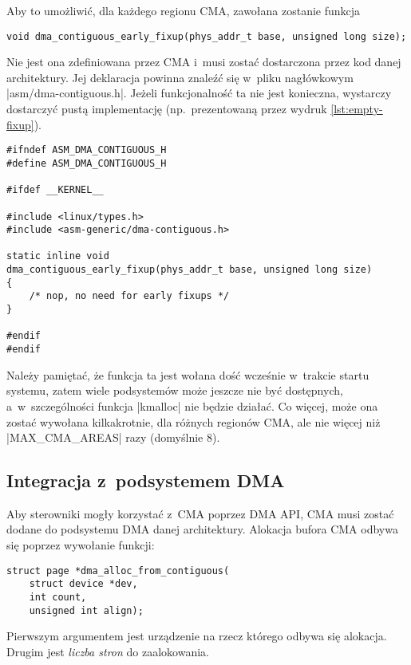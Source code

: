 Aby to umożliwić, dla każdego regionu CMA, zawołana zostanie funkcja

\begin{lstlisting}
void dma_contiguous_early_fixup(phys_addr_t base, unsigned long size);
\end{lstlisting}

Nie jest ona zdefiniowana przez CMA i~musi zostać dostarczona przez
kod danej architektury.  Jej deklaracja powinna znaleźć się w~pliku
nagłówkowym \code|asm/dma-contiguous.h|.  Jeżeli funkcjonalność
ta nie jest konieczna, wystarczy dostarczyć pustą implementację
(np.\ prezentowaną przez wydruk \ref{lst:empty-fixup}).

\begin{lstlisting}[float=tbhp,caption={Plik nagłówkowy
      \code|asm/dma-contiguous.h| z~pustą implementacją funkcji
      \code|dma_contiguous_early_fixup|.},label=lst:empty-fixup]
#ifndef ASM_DMA_CONTIGUOUS_H
#define ASM_DMA_CONTIGUOUS_H

#ifdef __KERNEL__

#include <linux/types.h>
#include <asm-generic/dma-contiguous.h>

static inline void
dma_contiguous_early_fixup(phys_addr_t base, unsigned long size)
{
	/* nop, no need for early fixups */
}

#endif
#endif
\end{lstlisting}

Należy pamiętać, że funkcja ta jest wołana dość wcześnie w~trakcie
startu systemu, zatem wiele podsystemów może jeszcze nie być
dostępnych, a~w~szczególności funkcja \code|kmalloc| nie będzie
działać.  Co więcej, może ona zostać wywołana kilkakrotnie, dla
różnych regionów CMA, ale nie więcej niż \code|MAX_CMA_AREAS|
razy (domyślnie 8).

\subsection{Integracja z~podsystemem DMA}\label{sec:usage-integrate}

Aby sterowniki mogły korzystać z~CMA poprzez DMA API, CMA musi zostać
dodane do podsystemu DMA danej architektury.  Alokacja bufora CMA
odbywa się poprzez wywołanie funkcji:

\begin{lstlisting}
struct page *dma_alloc_from_contiguous(
	struct device *dev,
	int count,
	unsigned int align);
\end{lstlisting}

Pierwszym argumentem jest urządzenie na rzecz którego odbywa się
alokacja.  Drugim jest \emph{liczba stron} do zaalokowania.

